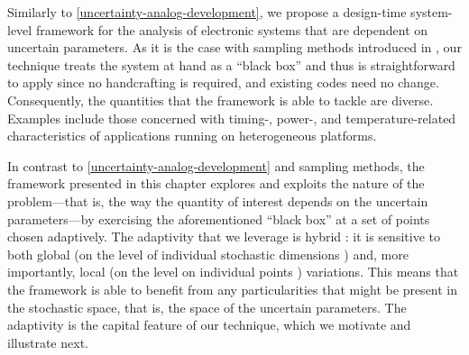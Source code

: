 Similarly to \cref{uncertainty-analog-development}, we propose a design-time
system-level framework for the analysis of electronic systems that are dependent
on uncertain parameters. As it is the case with sampling methods introduced in
, our technique treats the system at hand as a ``black box'' and
thus is straightforward to apply since no handcrafting is required, and existing
codes need no change. Consequently, the quantities that the framework is able to
tackle are diverse. Examples include those concerned with timing-, power-, and
temperature-related characteristics of applications running on heterogeneous
platforms.

In contrast to \cref{uncertainty-analog-development} and sampling methods, the
framework presented in this chapter explores and exploits the nature of the
problem---that is, the way the quantity of interest depends on the uncertain
parameters---by exercising the aforementioned ``black box'' at a set of points
chosen adaptively. The adaptivity that we leverage is hybrid \cite{jakeman2012}:
it is sensitive to both global (on the level of individual stochastic dimensions
\cite{klimke2006}) and, more importantly, local (on the level on individual
points \cite{ma2009}) variations. This means that the framework is able to
benefit from any particularities that might be present in the stochastic space,
that is, the space of the uncertain parameters. The adaptivity is the capital
feature of our technique, which we motivate and illustrate next.
